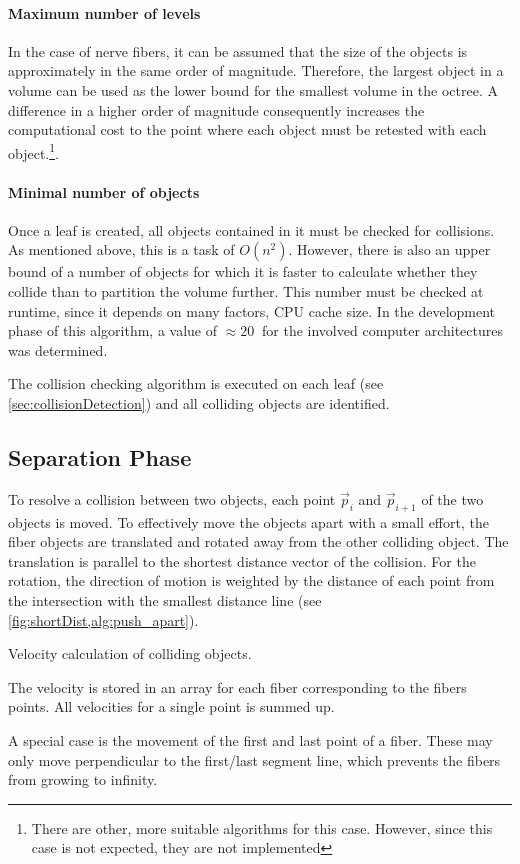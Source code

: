 \paragraph{Maximum number of levels}
In the case of nerve fibers, it can be assumed that the size of the objects is approximately in the same order of magnitude.
Therefore, the largest object in a volume can be used as the lower bound for the smallest volume in the octree.
A difference in a higher order of magnitude consequently increases the computational cost to the point where each object must be retested with each object.\footnote{There are other, more suitable algorithms for this case. However, since this case is not expected, they are not implemented}.
%
\paragraph{Minimal number of objects}
Once a leaf is created, all objects contained in it must be checked for collisions.
As mentioned above, this is a task of $O(n^2)$.
However, there is also an upper bound of a number of objects for which it is faster to calculate whether they collide than to partition the volume further.
This number must be checked at runtime, since it depends on many factors, \eg{} \ac{CPU} cache size.
In the development phase of this algorithm, a value of $\approx \SI{20}{}$ for the involved computer architectures was determined.
\par
%
The collision checking algorithm is executed on each leaf (see \cref{sec:collisionDetection}) and all colliding objects are identified.
% 
% 
%
\subsection{Separation Phase}
% 
To resolve a collision between two objects, each point $\vec{p}_i$ and $\vec{p}_{i+1}$ of the two objects is moved.
To effectively move the objects apart with a small effort, the fiber objects are translated and rotated away from the other colliding object.
The translation is parallel to the shortest distance vector of the collision.
For the rotation, the direction of motion is weighted by the distance of each point from the intersection with the smallest distance line (see \cref{fig:shortDist,alg:push_apart}).
\par
% 
\begin{lstfloat}[!h]
    
    \caption{Velocity calculation of colliding objects.}
    \label{alg:push_apart}
\end{lstfloat}
%
The velocity is stored in an array for each fiber corresponding to the fibers points.
All velocities for a single point is summed up.
\par
% 
A special case is the movement of the first and last point of a fiber.
These may only move perpendicular to the first/last segment line, which prevents the fibers from growing to infinity.
% 
% 
%
